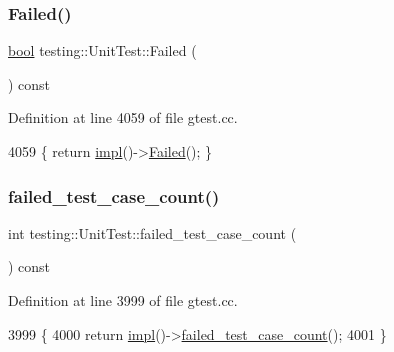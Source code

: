 \subsubsection{\texorpdfstring{Failed()}{Failed()}}
{\footnotesize\ttfamily \hyperlink{classbool}{bool} testing\+::\+Unit\+Test\+::\+Failed (\begin{DoxyParamCaption}{ }\end{DoxyParamCaption}) const}



Definition at line 4059 of file gtest.\+cc.


\begin{DoxyCode}
4059 \{ \textcolor{keywordflow}{return} \hyperlink{classtesting_1_1UnitTest_a4df5d11a58affb337d7fa62eaa07690e}{impl}()->\hyperlink{classtesting_1_1internal_1_1UnitTestImpl_a0c95d1b56b5f33057afc516db05ac313}{Failed}(); \}
\end{DoxyCode}
\mbox{\label{classtesting_1_1UnitTest_abc0fa297a4103f7cdd9627ae27d9d0ef}} 
\subsubsection{\texorpdfstring{failed\+\_\+test\+\_\+case\+\_\+count()}{failed\_test\_case\_count()}}
{\footnotesize\ttfamily int testing\+::\+Unit\+Test\+::failed\+\_\+test\+\_\+case\+\_\+count (\begin{DoxyParamCaption}{ }\end{DoxyParamCaption}) const}



Definition at line 3999 of file gtest.\+cc.


\begin{DoxyCode}
3999                                            \{
4000   \textcolor{keywordflow}{return} \hyperlink{classtesting_1_1UnitTest_a4df5d11a58affb337d7fa62eaa07690e}{impl}()->\hyperlink{classtesting_1_1internal_1_1UnitTestImpl_af981a537231e1dad4c1f092c6fdec1ff}{failed\_test\_case\_count}();
4001 \}
\end{DoxyCode}
\mbox{\label{classtesting_1_1UnitTest_ace1c860482b4ae5c341df5a9665e5c08}} 
